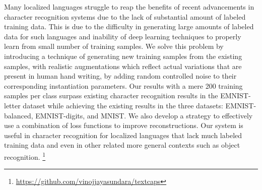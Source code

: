 Many localized languages struggle to reap the benefits of recent advancements in character recognition systems due to the lack of substantial amount of labeled training data. This is due to the  difficulty in generating large amounts of labeled data for such languages and inability of deep learning techniques to properly learn from small number of training samples. We solve this problem by introducing a technique of generating new training samples from the existing samples, with realistic augmentations which reflect actual variations that are present in human hand writing, by adding random controlled noise to their corresponding instantiation parameters. Our results with a mere 200 training samples per class surpass existing character recognition results in the EMNIST-letter dataset while achieving the existing results in the three datasets: EMNIST-balanced, EMNIST-digits, and MNIST. We also develop a strategy to effectively use a combination of loss functions to improve reconstructions. 
Our system is useful in character recognition for localized languages that lack much labeled training data and even in other related more general contexts such as object recognition. 
\footnote{\textcolor{blue}{\url{https://github.com/vinojjayasundara/textcaps}}}
